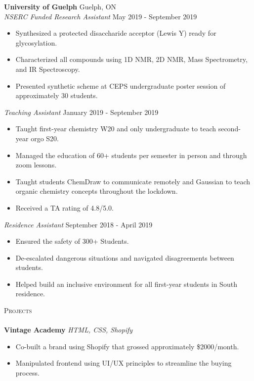 \documentclass[a4paper]{article}
\newcommand{\lineunder} {
    \vspace*{-8pt} \\
    \hspace*{-18pt} \hrulefill \\
}
\newcommand{\header} [1] {
    {\hspace*{-18pt}\vspace*{6pt} \textsc{#1}}
    \vspace*{-6pt} \lineunder
}
\begin{document}
\textbf{University of Guelph} \hfill Guelph, ON\\
\textit{NSERC Funded Research Assistant} \hfill May 2019 - September 2019\\
\vspace{-1mm}
\begin{itemize} \itemsep 1pt
	\item Synthesized a protected disaccharide acceptor (Lewis Y) ready for glycosylation.
	\item Characterized all compounds using 1D NMR, 2D NMR, Mass Spectrometry, and IR Spectroscopy.
	\item Presented synthetic scheme at CEPS undergraduate poster session of approximately 30 students.
\end{itemize}

\textit{Teaching Assistant} \hfill January 2019 - September 2019\\
\vspace{-1mm}
\begin{itemize} \itemsep 1pt
	\item Taught first-year chemistry W20 and only undergraduate to teach second-year orgo S20. 
	\item Managed the education of 60+ students per semester in person and through zoom lessons.
        \item Taught students ChemDraw to communicate remotely and Gaussian to teach organic chemistry concepts throughout the lockdown.
	\item Received a TA rating of 4.8/5.0.
\end{itemize}

\textit{Residence Assistant} \hfill September 2018 - April 2019\\
\vspace{-1mm}
\begin{itemize} \itemsep 1pt
	\item Ensured the safety of 300+ Students.
	\item De-escalated dangerous situations and navigated disagreements between students.
        \item Helped build an inclusive environment for all first-year students in South residence.
\end{itemize}


\header{Projects}
{\textbf{Vintage Academy}} {\sl HTML, CSS, Shopify} \\
\vspace{-1mm}
\begin{itemize} \itemsep 1pt
	\item Co-built a brand using Shopify that grossed approximately \$2000/month.
	\item Manipulated frontend using UI/UX principles to streamline the buying process.\\
\end{itemize}
\vspace*{1mm}
\end{document}
